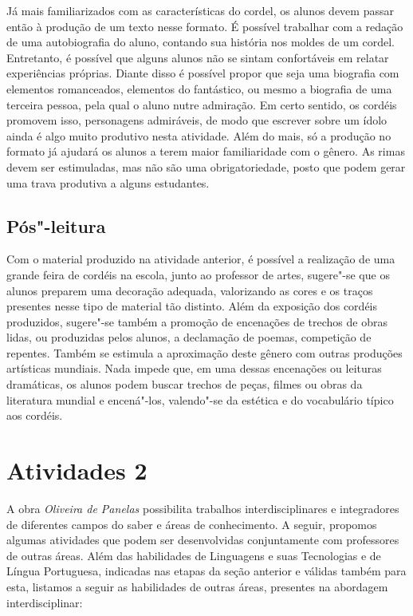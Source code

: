 \documentclass[12pt]{extarticle}
\begin{document}
{Já mais
familiarizados com as características do cordel, os alunos devem passar
então à produção de um texto nesse formato. É possível trabalhar com a
redação de uma autobiografia do aluno, contando sua história nos moldes
de um cordel. Entretanto, é possível que alguns alunos não se sintam
confortáveis em relatar experiências próprias. Diante disso é possível
propor que seja uma biografia com elementos romanceados, elementos do
fantástico, ou mesmo a biografia de uma terceira pessoa, pela qual o
aluno nutre admiração. Em certo sentido, os cordéis promovem isso,
personagens admiráveis, de modo que escrever sobre um ídolo ainda é algo
muito produtivo nesta atividade. Além do mais, só a produção no formato
já ajudará os alunos a terem maior familiaridade com o gênero. As rimas
devem ser estimuladas, mas não são uma obrigatoriedade, posto que podem
gerar uma trava produtiva a alguns estudantes.

\subsection{Pós"-leitura}


Com o material
produzido na atividade anterior, é possível a realização de uma grande
feira de cordéis na escola, junto ao professor de artes, sugere"-se que
os alunos preparem uma decoração adequada, valorizando as cores e os
traços presentes nesse tipo de material tão distinto. Além da exposição
dos cordéis produzidos, sugere"-se também a promoção de encenações de
trechos de obras lidas, ou produzidas pelos alunos, a declamação de
poemas, competição de repentes. Também se estimula a aproximação deste
gênero com outras produções artísticas mundiais. Nada impede que, em uma
dessas encenações ou leituras dramáticas, os alunos podem buscar trechos
de peças, filmes ou obras da literatura mundial e encená"-los, valendo"-se
da estética e do vocabulário típico aos cordéis.


\section{Atividades 2}

A obra \emph{Oliveira de Panelas} possibilita trabalhos
interdisciplinares e integradores de diferentes campos do saber e áreas
de conhecimento. A seguir, propomos algumas atividades que podem ser
desenvolvidas conjuntamente com professores de outras áreas. Além das
habilidades de Linguagens e suas Tecnologias e de Língua Portuguesa,
indicadas nas etapas da seção anterior e válidas também para esta,
listamos a seguir as habilidades de outras áreas, presentes na abordagem
interdisciplinar:

}
\end{document}
